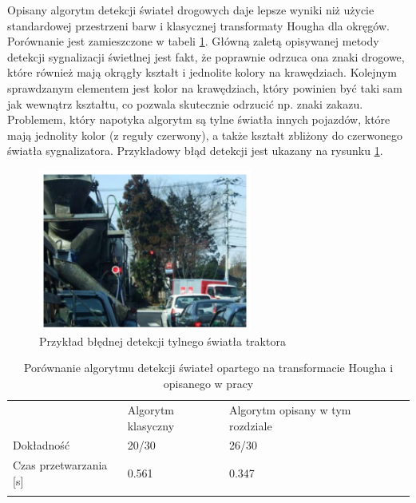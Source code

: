 
Opisany algorytm detekcji świateł drogowych daje lepsze wyniki niż użycie standardowej przestrzeni barw i klasycznej transformaty Hougha dla okręgów. 
Porównanie jest zamieszczone w tabeli \ref{tab:tl_results}. 
Główną zaletą opisywanej metody detekcji sygnalizacji świetlnej jest fakt, że poprawnie odrzuca ona znaki drogowe, które również mają okrągły kształt i jednolite kolory na krawędziach.
Kolejnym sprawdzanym elementem jest kolor na krawędziach, który powinien być taki sam jak wewnątrz kształtu, co pozwala skutecznie odrzucić np. znaki zakazu. 
Problemem, który napotyka algorytm są tylne światła innych pojazdów, które mają jednolity kolor (z reguły czerwony), a także kształt zbliżony do czerwonego światła sygnalizatora. 
Przykładowy błąd detekcji jest ukazany na rysunku \ref{fig:tl_err}.

\begin{figure}
  \centering
  \includegraphics[width=7cm]{img/tl_err.png}
  \caption{Przykład błędnej detekcji tylnego światła traktora\cite{T4}}
  \label{fig:tl_err}
\end{figure}

\begin{table}[]
\centering
\caption{Porównanie algorytmu detekcji świateł opartego na transformacie Hougha i opisanego w pracy\cite{T4}} 
\begin{tabular}{lllll}
\cline{1-3}
\multicolumn{1}{|l|}{}                           & \multicolumn{1}{l|}{Algorytm klasyczny} & \multicolumn{1}{l|}{Algorytm opisany w tym rozdziale} &  &  \\ \cline{1-3}
\multicolumn{1}{|l|}{Dokładność}                 & \multicolumn{1}{l|}{20/30}              & \multicolumn{1}{l|}{26/30}                            &  &  \\ \cline{1-3}
\multicolumn{1}{|l|}{Czas przetwarzania {[}s{]}} & \multicolumn{1}{l|}{0.561}              & \multicolumn{1}{l|}{0.347}                            &  &  \\ \cline{1-3}
                                                 &                                         &                                                       &  & 
\end{tabular}
\label{tab:tl_results}
\end{table}

